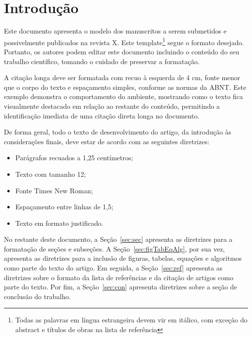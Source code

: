 \documentclass[a4paper,12pt]{article}
\begin{document}
	
	
	\revistaheader
	\newpage
	
	\onehalfspace  %
	\setlength{\parindent}{1.25cm}
	
	
	\section{Introdução}
	
	Este documento apresenta o modelo dos manuscritos a serem submetidos e possivelmente publicados na revista X. Este template\footnote{Todas as palavras em língua estrangeira devem vir em itálico, com exceção do abstract e títulos de obras na lista de referência} segue o formato desejado. Portanto, os autores podem editar este documento incluindo o conteúdo do seu trabalho científico, tomando o cuidado de preservar a formatação.
	
	\begin{citacao}
		A citação longa deve ser formatada com recuo à esquerda de 4 cm,
		fonte menor que o corpo do texto e espaçamento simples, conforme as
		normas da ABNT. Este exemplo demonstra o comportamento do ambiente,
		mostrando como o texto fica visualmente destacado em relação ao
		restante do conteúdo, permitindo a identificação imediata de uma
		citação direta longa no documento.
	\end{citacao}
	
	De forma geral, todo o texto de desenvolvimento do artigo, da introdução às considerações finais, deve estar de acordo com as seguintes diretrizes:
	\begin{itemize}
		\item Parágrafos recuados a 1,25 centímetros;
		\item Texto com tamanho 12;
		\item Fonte Times New Roman;
		\item Espaçamento entre linhas de 1,5;
		\item Texto em formato justificado.
	\end{itemize}
	
	No restante deste documento, a Seção~\ref{sec:sec} apresenta as diretrizes para a formatação de seções e subseções. A Seção~\ref{sec:figTabEqAlg}, por sua vez, apresenta as diretrizes para a inclusão de figuras, tabelas, equações e algoritmos como parte do texto do artigo. Em seguida, a Seção~\ref{sec:ref} apresenta as diretrizes sobre o formato da lista de referências e da citação de artigos como parte do texto. Por fim, a Seção~\ref{sec:con} apresenta diretrizes sobre a seção de conclusão do trabalho.
	
\end{document}
